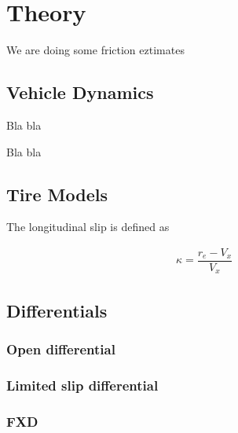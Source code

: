\chapter{Theory}


We are doing some friction eztimates

\section{Vehicle Dynamics}

Bla bla \cite{fordonsdynamik}

Bla bla \cite{pacejka}

\section{Tire Models}

The longitudinal slip is defined as

 \begin{align*}
	 \kappa = \dfrac{r_{e}-V_{x}}{V_{x}}
\end{align*}

\section{Differentials}

\subsection{Open differential}

\subsection{Limited slip differential}

\subsection{FXD}
